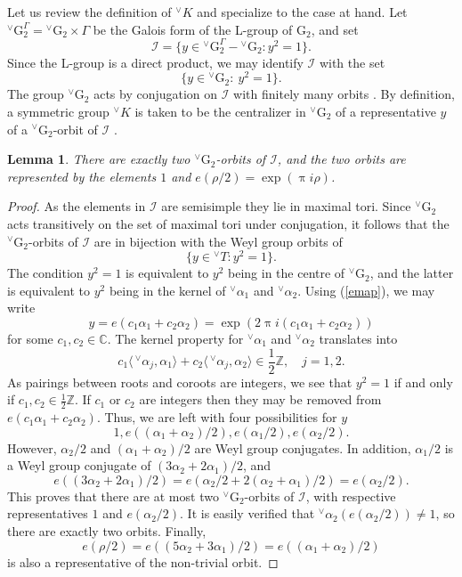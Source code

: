\documentclass[a4paper, 11pt]{article}
\newtheorem{lem}[theo]{Lemma}
\begin{document}
Let us
review the definition of ${^\vee}K$ and specialize to the case at
hand.  Let ${^\vee}\mathrm{G}_{2}^{\Gamma} = {^\vee}\mathrm{G}_{2} \times
\Gamma$ be the Galois form of the L-group of $\mathrm{G}_{2}$,
and set
$$\mathcal{I} = \{y \in {^\vee}\mathrm{G}_{2}^{\Gamma} -
{^\vee}\mathrm{G}_{2} : y^{2} =1\}.$$
Since the L-group is a direct product, we may identify $\mathcal{I}$
with the set 
$$ \{y \in {^\vee}\mathrm{G}_{2}:  \ y^{2} =1\}.$$
The group ${^\vee}\mathrm{G}_{2}$ acts by conjugation on $\mathcal{I}$
with finitely many orbits \cite[Lemma 6.12]{ABV}.  By definition, a
symmetric group
${^\vee}K$ is taken to be the centralizer in 
${^\vee}\mathrm{G}_{2}$ of a representative $y$ of a
${^\vee}\mathrm{G}_{2}$-orbit of $\mathcal{I}$ \cite[Proposition 6.16]{ABV}. 
\begin{lem}
\label{Iorbits}
There are exactly two ${^\vee}\mathrm{G}_{2}$-orbits of $\mathcal{I}$, and
the two orbits are represented by the elements $1$ and
$e(\rho/2) = \exp(\uppi i \rho)$.   
\end{lem}
\begin{proof}
 As the elements in $\mathcal{I}$ are
semisimple they lie in maximal tori. Since  ${^\vee}\mathrm{G}_{2}$ acts
transitively on the set of maximal tori under conjugation, it follows that
the ${^\vee}\mathrm{G}_{2}$-orbits of $\mathcal{I}$ are in bijection
with the Weyl group orbits of
$$\{ y \in {^\vee}T: y^{2} = 1\}.$$
 The condition $y^{2} = 1$ is equivalent to $y^{2}$ being in the centre of
${^\vee}\mathrm{G}_{2}$, and the latter is equivalent to $y^{2}$ being
in the kernel of
${^\vee}\alpha_{1}$ and ${^\vee}\alpha_{2}$. Using (\ref{emap}), we
may write  
$$y = e(c_{1} \alpha_{1} + c_{2} 
\alpha_{2}) = \exp(2 \uppi i (c_{1} \alpha_{1} + c_{2} 
\alpha_{2}))$$
 for some $c_{1}, c_{2} \in \mathbb{C}$.  The kernel
property  for ${^\vee}\alpha_{1}$ and ${^\vee}\alpha_{2}$ translates into 
$$c_{1} \langle \, {^\vee}\alpha_{j}, \alpha_{1} \rangle + c_{2} \langle \,
{^\vee}\alpha_{j}, \alpha_{2} \rangle \in \frac{1}{2} \mathbb{Z},
\quad j = 1,2.$$
As pairings between roots and coroots are integers, we see that
$y^{2} = 1$ if and only if 
$c_{1}, c_{2} \in \frac{1}{2} \mathbb{Z}$.  If $c_{1}$ or $c_{2}$ are
integers then they may be removed from $e(c_{1} \alpha_{1} + c_{2}
\alpha_{2})$.  Thus, we are left with four possibilities for $y$
$$1, e((\alpha_{1}+\alpha_{2})/2), e(\alpha_{1}/2), e(\alpha_{2}/2).$$
However, $\alpha_{2}/2$ and $(\alpha_{1} + \alpha_{2})/2$ are Weyl group
conjugates. In addition, $\alpha_{1}/2$ is a Weyl group conjugate of $(3
\alpha_{2} + 2 \alpha_{1})/2$, and 
$$e((3\alpha_{2} + 2 \alpha_{1}) /2) = e(\alpha_{2}/2 + 2(\alpha_{2} +
\alpha_{1})/2) = e(\alpha_{2}/2).$$
This proves that there are at most two ${^\vee}\mathrm{G}_{2}$-orbits
of $\mathcal{I}$, with respective representatives $1$ and $e(\alpha_{2}/2)$.  It
is easily verified that 
${^\vee}\alpha_{2}(e(\alpha_{2}/2)) \neq 1$, so there are exactly two
orbits.  Finally,
$$e(\rho/2) = e((5\alpha_{2} + 3\alpha_{1})/2) = e((\alpha_{1} + \alpha_{2})/2)$$
is also a representative of the non-trivial orbit.
\end{proof}
\end{document}
